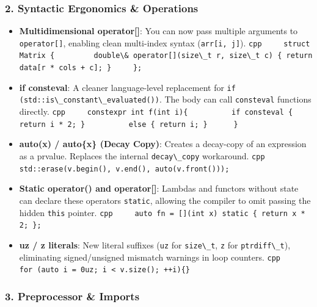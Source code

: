 \hypertarget{syntactic-ergonomics-operations}{%
\subsubsection{2. Syntactic Ergonomics \&
Operations}\label{syntactic-ergonomics-operations}}

\begin{itemize}
\tightlist
\item
  \textbf{Multidimensional operator{[}{]}}: You can now pass multiple
  arguments to \passthrough{\lstinline!operator[]!}, enabling clean
  multi-index syntax (\passthrough{\lstinline!arr[i, j]!}).
  \passthrough{\lstinline!cpp     struct Matrix \{         double\& operator[](size\_t r, size\_t c) \{ return data[r * cols + c]; \}     \};!}
\item
  \textbf{if consteval}: A cleaner language-level replacement for
  \passthrough{\lstinline!if (std::is\_constant\_evaluated())!}. The
  body can call \passthrough{\lstinline!consteval!} functions directly.
  \passthrough{\lstinline!cpp     constexpr int f(int i)\{          if consteval \{ return i * 2; \}          else \{ return i; \}      \}!}
\item
  \textbf{auto(x) / auto\{x\} (Decay Copy)}: Creates a decay-copy of an
  expression as a prvalue. Replaces the internal
  \passthrough{\lstinline!decay\_copy!} workaround.
  \passthrough{\lstinline!cpp     std::erase(v.begin(), v.end(), auto(v.front()));!}
\item
  \textbf{Static operator() and operator{[}{]}}: Lambdas and functors
  without state can declare these operators
  \passthrough{\lstinline!static!}, allowing the compiler to omit
  passing the hidden \passthrough{\lstinline!this!} pointer.
  \passthrough{\lstinline!cpp     auto fn = [](int x) static \{ return x * 2; \};!}
\item
  \textbf{uz / z literals}: New literal suffixes
  (\passthrough{\lstinline!uz!} for \passthrough{\lstinline!size\_t!},
  \passthrough{\lstinline!z!} for \passthrough{\lstinline!ptrdiff\_t!}),
  eliminating signed/unsigned mismatch warnings in loop counters.
  \passthrough{\lstinline!cpp     for (auto i = 0uz; i < v.size(); ++i)\{\}!}
\end{itemize}

\hypertarget{preprocessor-imports}{%
\subsubsection{3. Preprocessor \& Imports}\label{preprocessor-imports}}

